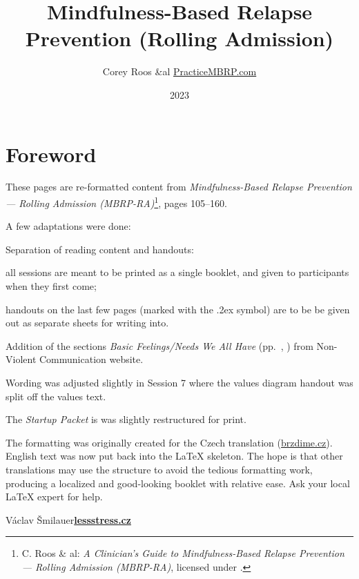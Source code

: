 \documentclass[11pt,a5paper,twoside]{article}
\title{Mindfulness-Based Relapse Prevention (Rolling Admission)}
\date{2023}
\author{Corey Roos \&al \href{https://PracticeMBRP.com}{PracticeMBRP.com}}
\def\lessstressLogo{\href{https://lessstress.cz}{\textsf{\textbf{le\uline{\uline{\uline{s}s}s}tre\uline{\uline{s}s}.cz\uline{\hphantom{s}}}}}}
\def\normalPencilLeftDown{\texorpdfstring{\lower.2ex\hbox{\textmd{\PencilLeftDown}}}{}}
\begin{document}
	\thispagestyle{empty}
	\section*{Foreword}

	\vskip-3mm

	These pages are re-formatted content from \emph{Mindfulness-Based Relapse Prevention — Rolling Admission (MBRP-RA)}\footnote{C. Roos \& al: \emph{A Clinician's Guide to Mindfulness-Based Relapse Prevention — Rolling Admission (MBRP-RA)}, licensed under \doclicenseNameRef.}, pages 105–160.

	A few adaptations were done:
	\begin{itemize*}
		\item Separation of reading content and handouts:
			\begin{itemize*}
				\item all sessions are meant to be printed as a single booklet, and given to participants when they first come;
				\item handouts on the last few pages (marked with the \normalPencilLeftDown{} symbol) are to be be given out as separate sheets for writing into.
			\end{itemize*}
		\item Addition of the sections \emph{Basic Feelings/Needs We All Have} (pp.~\pageref{basic-feelings-we-all-have}, \pageref{basic-needs-we-all-have}) from Non-Violent Communication website.
		\item Wording was adjusted slightly in Session 7 where the values diagram handout was split off the values text.
		\item The \emph{Startup Packet} is was slightly restructured for print.
	\end{itemize*}

	The formatting was originally created for the Czech translation (\href{https://brzdime.cz}{brzdime.cz}). English text was now put back into the \LaTeX{} skeleton. The hope is that other translations may use the structure to avoid the tedious formatting work, producing a localized and good-looking booklet with relative ease. Ask your local \LaTeX{} expert for help.

	\hfill Václav Šmilauer\linebreak\null\hfill\linebreak\null\hfill\lessstressLogo

	\setlength{\cftbeforesecskip}{1ex}
	\clearpage
	\tableofcontents
	\thispagestyle{empty}

	
	
	
\end{document}
